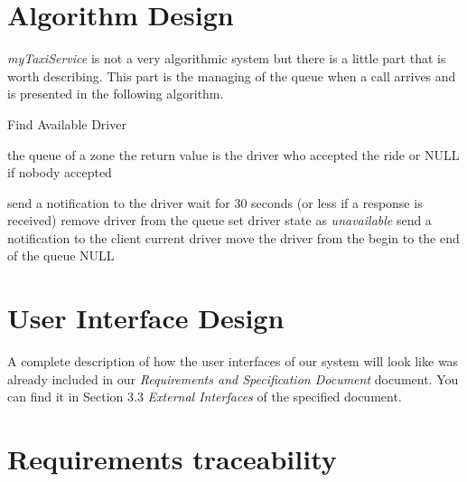 \documentclass[a4paper]{article}
\begin{document}
\section{Algorithm Design}
\label{sec:sec3}

\emph{myTaxiService} is not a very algorithmic system but there is a little part that is worth describing.
This part is the managing of the queue when a call arrives and is presented in the following algorithm.

\begin{center}
\begin{minipage}{.8\textwidth}
\begin{algorithm}[H]
\caption{Find Available Driver}
\label{alg:findavailabledriver}
\begin{algorithmic}
    
    \REQUIRE the queue of a zone
    \ENSURE the return value is the driver who accepted the ride or NULL if nobody accepted
    
        \STATE send a notification to the driver
        \STATE wait for 30 seconds (or less if a response is received)
            \STATE remove driver from the queue
            \STATE set driver state as \emph{unavailable}
            \STATE send a notification to the client
            \RETURN current driver
            \STATE move the driver from the begin to the end of the queue
        \ENDIF
    \ENDFOR
    \RETURN NULL
\end{algorithmic}
\end{algorithm}
\end{minipage}
\end{center}

\section{User Interface Design}
A complete description of how the user interfaces of our system will look like was already included in our \emph{Requirements and Specification Document} document. You can find it in Section 3.3 \emph{External Interfaces} of the specified document.

\section{Requirements traceability}
\end{document}
